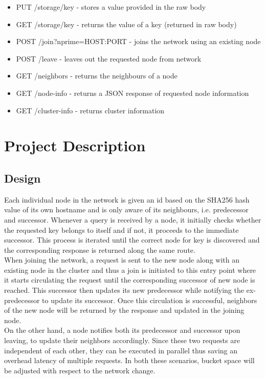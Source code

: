 \documentclass[
    a4paper,
    twocolumn,
]{article}
\begin{document}
\begin{itemize}
	\item PUT /storage/key - stores a value provided in the raw body
	\item GET /storage/key - returns the value of a key (returned in raw body)
	\item POST /join?nprime=HOST:PORT - joins the network using an existing node
	\item POST /leave - leaves out the requested node from network
	\item GET /neighbors - returns the neighbours of a node
	\item GET /node-info - returns a JSON response of requested node information
	\item GET /cluster-info - returns cluster information
\end{itemize}

\section{Project Description}
\subsection{Design}

Each individual node in the network is given an id based on the SHA256 hash value of its own hostname and is only aware of its neighbours, i.e. predecessor and successor. Whenever a query is received by a node, it initially checks whether the requested key belongs to itself and if not, it proceeds to the immediate successor. This process is iterated until the correct node for key is discovered and the corresponding response is returned along the same route. \\

When joining the network, a request is sent to the new node along with an existing node in the cluster and thus a join is initiated to this entry point where it starts circulating the request until the corresponding successor of new node is reached. This successor then updates its new predecessor while notifying the ex-predecessor to update its successor. Once this circulation is successful, neighbors of the new node will be returned by the response and updated in the joining node.\\

On the other hand, a node notifies both its predecessor and successor upon leaving, to update their neighbors accordingly. Since these two requests are independent of each other, they can be executed in parallel thus saving an overhead latency of multiple requests. In both these scenarios, bucket space will be adjusted with respect to the network change. \\
\end{document}
